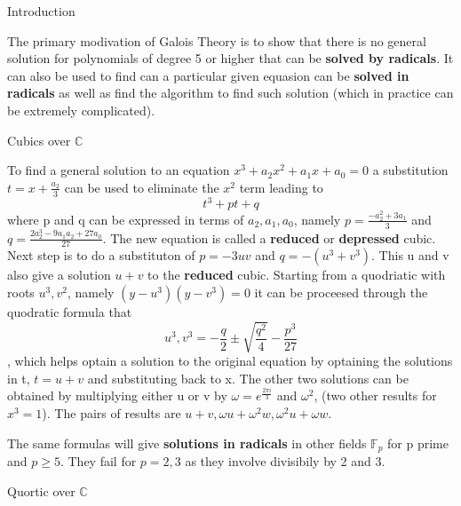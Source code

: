 \documentclass[12pt, letterpaper]{article}
\begin{document}
\begin{section}{Introduction}

  The primary modivation of Galois Theory is to show that there is no general
  solution for polynomials of degree 5 or higher that can be \textbf{solved by
  radicals}. It can also be used to find can a particular given equasion can be
  \textbf{solved in radicals} as well as find the algorithm to find such
  solution (which in practice can be extremely complicated).

  \begin{subsection}{Cubics over \(\mathbb{C}\)}

    To find a general solution to an equation
    \(x^{3} + a_{2}x^{2} + a_{1}x + a_{0} = 0\) a substitution
    \(t = x + \frac{a_{2}}{3}\) can be used to eliminate the \(x^{2}\) term
    leading to \[t^{3} + pt + q\] where p and q can be expressed in terms of
    \(a_{2}, a_{1}, a_{0}\), namely \(p = \frac{-a^{2}_{2} + 3a_{1}}{3}\) and
    \(q = \frac{2a^{3}_{2} -9a_{1}a_{2} + 27a_{0}}{27}\). The new equation is
    called a \textbf{reduced} or \textbf{depressed} cubic. Next step is to do a
    substituton of \(p = -3uv\) and \(q = -(u^{3} + v^{3})\). This u and v also
    give a solution \(u + v\) to the \textbf{reduced} cubic. Starting from a
    quodriatic with roots \(u^{3}, v^{2}\), namely
    \((y - u^{3})(y - v^{3}) = 0\) it can be proceesed through the quodratic
    formula
    that \[u^{3}, v^{3} = -\frac{q}{2} \pm \sqrt{\frac{q^{2}}{4}} - \frac{p^{3}}{27}\],
    which helps optain a solution to the original equation by optaining the
    solutions in t, \(t = u + v\) and substituting back to x. The other two
    solutions can be obtained by multiplying either u or v by
    \(\omega = e^{\frac{2\pi i}{3}}\) and \(\omega^{2}\), (two other results for
    \(x^{3} = 1\)). The pairs of results are
    \(u + v, \omega u + \omega^{2} w, \omega^{2} u + \omega w\).

    The same formulas will give \textbf{solutions in radicals} in other fields
    \(\mathbb{F}_{p}\) for p prime and \(p \geq 5\). They fail for \(p = 2, 3\)
    as they involve divisibily by 2 and 3.

  \end{subsection}

  \begin{subsection}{Quortic over \(\mathbb{C}\)}


\end{subsection}
\end{section}
\end{document}

